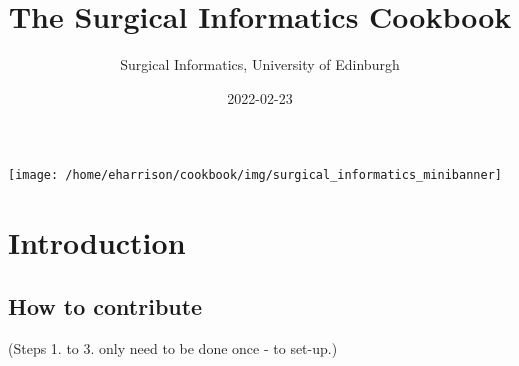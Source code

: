 \documentclass[
]{book}
\title{The Surgical Informatics Cookbook}
\author{Surgical Informatics, University of Edinburgh}
\date{2022-02-23}
\begin{document}
\maketitle

{
\setcounter{tocdepth}{1}
\tableofcontents
}
\hypertarget{section}{%
\chapter*{}\label{section}}

\texttt{[image: /home/eharrison/cookbook/img/surgical\_informatics\_minibanner]}

\hypertarget{introduction}{%
\chapter{Introduction}\label{introduction}}

\hypertarget{how-to-contribute}{%
\section{How to contribute}\label{how-to-contribute}}

(Steps 1. to 3. only need to be done once - to set-up.)
\end{document}
